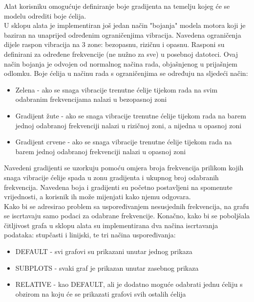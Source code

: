 \documentclass[times, utf8, diplomski]{fer}
\begin{document}
Alat korisniku omogućuje definiranje boje gradijenta na temelju kojeg će se modelu odrediti boje ćelija.\\

U sklopu alata je implementiran još jedan način "bojanja" modela motora koji je baziran na unaprijed određenim ograničenjima vibracija. Navedena ograničenja dijele raspon vibracija na 3 zone: bezopasnu, rizičnu i opasnu. Rasponi su definirani za određene frekvencije (ne nužno za sve) u posebnoj datoteci. Ovaj način bojanja je odvojen od normalnog načina rada, objašnjenog u prijašnjem odlomku. Boje ćelija u načinu rada s ograničenjima se određuju na sljedeći način:
\begin{itemize}
\item Zelena - ako se snaga vibracije trenutne ćelije tijekom rada na svim odabranim frekvencijama nalazi u bezopasnoj zoni
\item Gradijent žute - ako se snaga vibracije trenutne ćelije tijekom rada na barem jednoj odabranoj frekvenciji nalazi u rizičnoj zoni, a nijedna u opasnoj zoni
\item Gradijent crvene - ako se snaga vibracije trenutne ćelije tijekom rada na barem jednoj odabranoj frekvenciji nalazi u opasnoj zoni\\
\end{itemize}

Navedeni gradijenti se uzorkuju pomoću omjera broja frekvencija prilikom kojih snaga vibracije ćelije spada u zonu gradijenta i ukupnog broj odabranih frekvencija. Navedena boja i gradijenti su početno postavljeni na spomenute vrijednosti, a korisnik ih može mijenjati kako njemu odgovara.\\

Kako bi se adresirao problem sa uspoređivanjem nesusjednih frekvencija, na grafu se iscrtavaju samo podaci za odabrane frekvencije. Konačno, kako bi se poboljšala čitljivost grafa u sklopu alata su implementirana dva načina iscrtavanja podataka: stupčasti i linijski, te tri načina uspoređivanja:
\begin{itemize}
\item DEFAULT - svi grafovi su prikazani unutar jednog prikaza
\item SUBPLOTS - svaki graf je prikazan unutar zasebnog prikaza
\item RELATIVE - kao DEFAULT, ali je dodatno moguće odabrati jednu ćeliju s obzirom na koju će se prikazati grafovi svih ostalih ćelija\\
\end{itemize}
\end{document}

